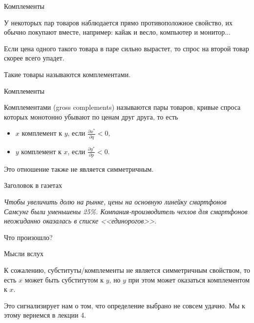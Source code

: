 \documentclass{beamer}
\begin{document}
\begin{frame}{Комплементы}

У некоторых пар товаров наблюдается прямо противоположное свойство, их обычно покупают вместе, например: кайак и весло, компьютер и монитор...  

Если цена одного такого товара в паре сильно вырастет, то спрос на второй товар скорее всего упадет. 

Такие товары называются комплементами.

\end{frame}

\begin{frame}{Комплементы}

\begin{definition}
\alert{Комплементами} (gross complements) называются пары товаров, кривые спроса которых монотонно убывают по ценам друг друга, то есть 

\begin{itemize}
  \item $x$ комплемент к $y$, если $\frac{\partial x^{\ast}}{\partial q} < 0,$
  \item $y$ комплемент к $x$, если $\frac{\partial y^{\ast}}{\partial p} < 0.$
\end{itemize}
\end{definition}

Это отношение также не является симметричным.

\end{frame}

\begin{frame}{Заголовок в газетах}

\textit{Чтобы увеличить долю на рынке, цены на основную линейку смартфонов Самсунг были уменьшены 25\%. Компания-производитель чехлов для смартфонов неожиданно оказалась в списке <<единорогов>>.}

Что произошло?

\end{frame}

\begin{frame}{Мысли вслух}

К сожалению, субституты/комплементы не является симметричным свойством, то есть $x$ может быть субститутом к $y$, но $y$ при этом может оказаться комплементом к $x$. 

Это сигнализирует нам о том, что определение выбрано не совсем удачно. Мы к этому вернемся в лекции 4.

\end{frame}
\end{document}
